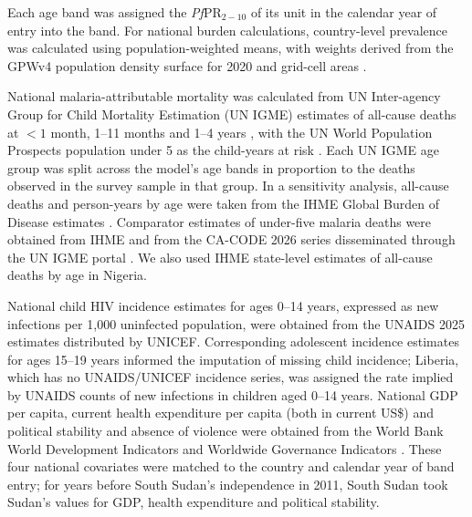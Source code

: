 Each age band was assigned the \textit{Pf}PR$_{2-10}$ of its unit in the calendar year of entry into the band. For national burden calculations, country-level prevalence was calculated using population-weighted means, with weights derived from the GPWv4 population density surface for 2020 and grid-cell areas \cite{gpwv4}.

National malaria-attributable mortality was calculated from UN Inter-agency Group for Child Mortality Estimation (UN IGME) estimates of all-cause deaths at $<1$ month, 1--11 months and 1--4 years \cite{igme}, with the UN World Population Prospects population under 5 as the child-years at risk \cite{wpp}. Each UN IGME age group was split across the model's age bands in proportion to the deaths observed in the survey sample in that group. In a sensitivity analysis, all-cause deaths and person-years by age were taken from the IHME Global Burden of Disease estimates \cite{ihme}. Comparator estimates of under-five malaria deaths were obtained from IHME and from the CA-CODE 2026 series disseminated through the UN IGME portal \cite{Perin:26,Villavicencio:24}. We also used IHME state-level estimates of all-cause deaths by age in Nigeria.

National child HIV incidence estimates for ages 0--14 years, expressed as new infections per 1,000 uninfected population, were obtained from the UNAIDS 2025 estimates distributed by UNICEF. Corresponding adolescent incidence estimates for ages 15--19 years informed the imputation of missing child incidence; Liberia, which has no UNAIDS/UNICEF incidence series, was assigned the rate implied by UNAIDS counts of new infections in children aged 0--14 years. National GDP per capita, current health expenditure per capita (both in current US\$) and political stability and absence of violence were obtained from the World Bank World Development Indicators and Worldwide Governance Indicators \cite{wdi,wgi}. These four national covariates were matched to the country and calendar year of band entry; for years before South Sudan's independence in 2011, South Sudan took Sudan's values for GDP, health expenditure and political stability.
